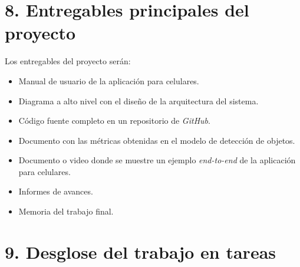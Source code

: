 \documentclass[
11pt, %
]{charter}
\begin{document}
\section{8. Entregables principales del proyecto}
\label{sec:entregables}
Los entregables del proyecto serán:
\begin{itemize}
	\item Manual de usuario de la aplicación para celulares.
	\item Diagrama a alto nivel con el diseño de la arquitectura del sistema.
	\item Código fuente completo en un repositorio de \textit{GitHub}.
	\item Documento con las métricas obtenidas en el modelo de detección de objetos.
	\item Documento o video donde se muestre un ejemplo \textit{end-to-end} de la aplicación para celulares.
	\item Informes de avances.
	\item Memoria del trabajo final.
\end{itemize}

\section{9. Desglose del trabajo en tareas}
\label{sec:wbs}
\end{document}
